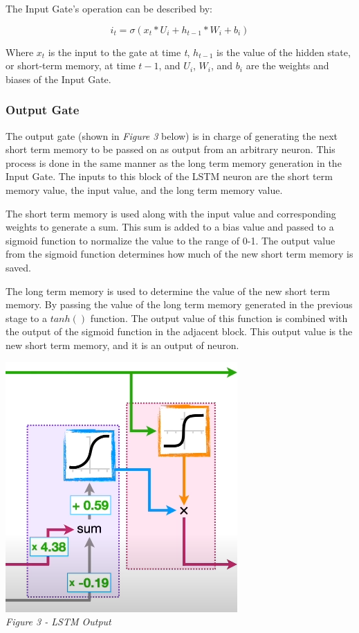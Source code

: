 \documentclass[12pt]{article}
\begin{document}
The Input Gate's operation can be described by:

\begin{equation}
    i_t = \sigma(x_t*U_i + h_{t-1}*W_i + b_i)
\end{equation}

Where $x_t$ is the input to the gate at time \emph{t}, $h_{t-1}$ is the value
of the hidden state, or short-term memory, at time $t - 1$, and $U_i$, $W_i$,
and $b_i$ are the weights and biases of the Input Gate.

\subsubsection{Output Gate}

The output gate (shown in \emph{Figure 3} below) is in charge of generating the
next short term memory to be passed on as output from an arbitrary neuron. This
process is done in the same manner as the long term memory generation in the
Input Gate. The inputs to this block of the LSTM neuron are the short term
memory value, the input value, and the long term memory value.

The short term memory is used along with the input value and corresponding
weights to generate a sum. This sum is added to a bias value and passed to a
sigmoid function to normalize the value to the range of 0-1. The output value
from the sigmoid function determines how much of the new short term memory is
saved.

The long term memory is used to determine the value of the new short term
memory. By passing the value of the long term memory generated in the previous
stage to a $tanh()$ function. The output value of this function is combined
with the output of the sigmoid function in the adjacent block. This output
value is the new short term memory, and it is an output of neuron.

\begin{center}
    \includegraphics{OutputGate.png}\\
    \emph{Figure 3 - LSTM Output}
\end{center}
\end{document}
